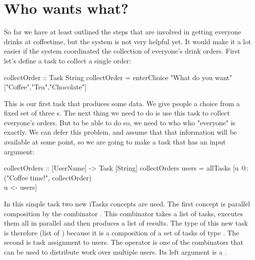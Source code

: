 \documentclass[a4paper,11pt]{article}
\begin{document}
\section{Who wants what?}
So far we have at least outlined the steps that are involved in getting everyone drinks at coffeetime, but the system is not very helpful yet.
It would make it a lot easier if the system coordinated the collection of everyone's drink orders. First let's define a task to collect a single order:
\begin{CleanCode}
collectOrder :: Task String
collectOrder = enterChoice "What do you want" ["Coffee","Tea","Chocolate"]
\end{CleanCode}
This is our first task that produces some data. We give people a choice from a fixed set of three s. The next thing we need to do is use this task to collect everyone's orders. But to be able to do so, we need to who who "everyone" is exactly. We can defer this problem, and assume that that information will be available at some point, so we are going to make a task that has an input argument:
\begin{CleanCode}
collectOrders :: [UserName] -> Task [String]
collectOrders users = allTasks [u @: ("Coffee time!", collectOrder) \\ u <- users]
\end{CleanCode}
In this simple task two new iTasks concepts are used. The first concept is parallel composition by the combinator . This combinator takes a list of tasks, executes them all in parallel and then produces a list of results. The type of this new task is therefore \CleanInline{[String]} (list of ) because it is a composition of a set of tasks of type . The second is task assignment to users. The  operator is one of the combinators that can be used to distribute work over multiple users. Its left argument is a .
\end{document}
